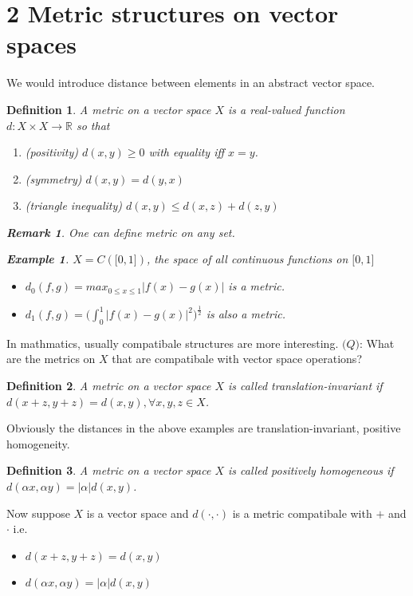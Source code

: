 \documentclass{article}
\newtheorem*{definition}{Definition}
\newtheorem*{remark}{Remark}
\newtheorem*{example}{Example}
\begin{document}
\section*{2 Metric structures on vector spaces}
We would introduce distance between elements in an abstract vector space.
\begin{definition}
    A metric on a vector space $X$ is a real-valued function $d: X \times X \rightarrow \mathbb{R}$ so that
    \begin{enumerate}
        \item (positivity) $d(x, y)\ge0$ with equality iff $x=y$.
        \item (symmetry) $d(x, y)=d(y, x)$
        \item (triangle inequality) $d(x, y) \le d(x, z) + d(z, y)$
    \end{enumerate}
    \begin{remark}
        One can define metric on any set.
    \end{remark}
    \begin{example}
        $X=C(\bigl[0, 1\bigr])$, the space of all continuous functions on $\bigl[0, 1\bigr]$
        \begin{itemize}
            \item $d_0(f, g) = max_{0 \le x \le 1}|f(x) - g(x)|$ is a metric.
            \item $d_1(f, g) = \bigl(\int_{0}^{1}{|f(x) - g(x)|^2}\bigr)^\frac{1}{2}$ is also a metric.
        \end{itemize}
    \end{example}
\end{definition}
In mathmatics, usually compatibale structures are more interesting.
$\mathbb(Q)$: What are the metrics on $X$ that are compatibale with vector space operations?
\begin{definition}
    A metric on a vector space $X$ is called translation-invariant if 
    $d(x + z, y + z) = d(x, y), \forall x, y, z \in X$.
\end{definition}
Obviously the distances in the above examples are translation-invariant, positive homogeneity.
\begin{definition}
    A metric on a vector space $X$ is called positively homogeneous if
    $d(\alpha x, \alpha y) = |\alpha|d(x, y)$.
\end{definition}
Now suppose $X$ is a vector space and $d(\cdot, \cdot)$ is a metric compatibale 
with $+$ and $\cdot$ i.e.
\begin{itemize}
    \item $d(x + z, y + z) = d(x, y)$
    \item $d(\alpha x, \alpha y) = |\alpha|d(x, y)$
\end{itemize}
\end{document}
